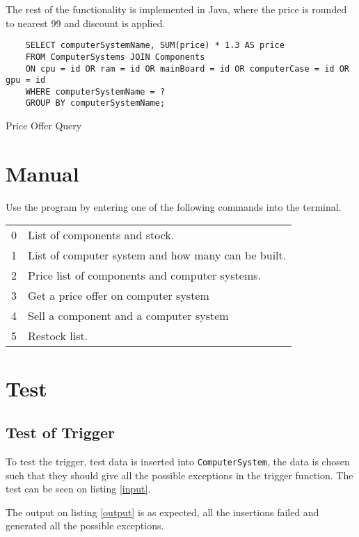 \documentclass[12pt,a4paper]{article}
\begin{document}
The rest of the functionality is implemented in Java, where the price is rounded to nearest 99 and discount is applied.

\begin{listing}[!htbp]
    \begin{verbatim}
    SELECT computerSystemName, SUM(price) * 1.3 AS price
    FROM ComputerSystems JOIN Components
    ON cpu = id OR ram = id OR mainBoard = id OR computerCase = id OR gpu = id
    WHERE computerSystemName = ?
    GROUP BY computerSystemName;
    \end{verbatim}
    \caption{Price Offer Query}
    \label{lst:offer}
    \end{listing}
\section{Manual}
Use the program by entering one of the following commands into the terminal.

{\ttfamily
\begin{center}
\begin{tabular}{ll}
    0 & List of components and stock. \\ 
    1 & List of computer system and how many can be built. \\ 
    2 & Price list of components and computer systems. \\ 
    3 & Get a price offer on computer system \\
    4 & Sell a component and a computer system \\
    5 & Restock list. \\ 
\end{tabular}
\end{center}}

\section{Test}
\subsection{Test of Trigger}
To test the trigger, test data is inserted into \texttt{ComputerSystem}, the data is chosen such that they should give all the possible exceptions in the trigger function. The test can be seen on listing \ref{input}.

The output on listing \ref{output} is as expected, all the insertions failed and generated all the possible exceptions.
\end{document}
